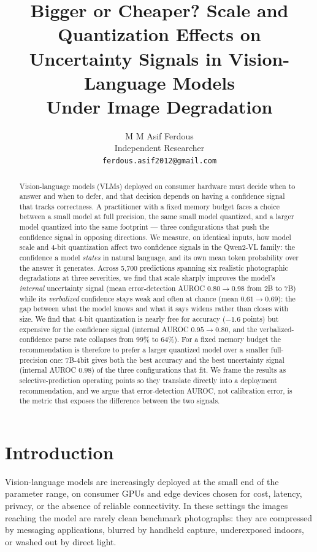 \documentclass[11pt]{article}
\title{Bigger or Cheaper? Scale and Quantization Effects on\\
       Uncertainty Signals in Vision-Language Models\\
       Under Image Degradation}
\author{M M Asif Ferdous \\
        Independent Researcher \\
        \texttt{ferdous.asif2012@gmail.com}}
\begin{document}
\maketitle

\begin{abstract}
Vision-language models (VLMs) deployed on consumer hardware must decide when to
answer and when to defer, and that decision depends on having a confidence
signal that tracks correctness. A practitioner with a fixed memory budget faces
a choice between a small model at full precision, the same small model
quantized, and a larger model quantized into the same footprint --- three
configurations that push the confidence signal in opposing directions.
We measure, on identical inputs, how model scale and 4-bit quantization affect
two confidence signals in the Qwen2-VL family: the confidence a model
\emph{states} in natural language, and its own mean token probability over the
answer it generates. Across 5{,}700 predictions spanning six realistic
photographic degradations at three severities, we find that scale sharply
improves the model's \emph{internal} uncertainty signal (mean error-detection
AUROC $0.80\!\to\!0.98$ from 2B to 7B) while its \emph{verbalized} confidence
stays weak and often at chance (mean $0.61\!\to\!0.69$): the gap between what the
model knows and what it says widens rather than closes with size. We find that
4-bit quantization is nearly free for accuracy ($-1.6$ points) but expensive for
the confidence signal (internal AUROC $0.95\!\to\!0.80$, and the
verbalized-confidence parse rate collapses from $99\%$ to $64\%$). For a fixed
memory budget the recommendation is therefore to prefer a larger quantized model
over a smaller full-precision one: 7B-4bit gives both the best accuracy and the
best uncertainty signal (internal AUROC $0.98$) of the three configurations that
fit. We frame the results as selective-prediction operating points so they
translate directly into a deployment recommendation, and we argue that
error-detection AUROC, not calibration error, is the metric that exposes the
difference between the two signals.
\end{abstract}

\section{Introduction}
Vision-language models are increasingly deployed at the small end of the
parameter range, on consumer GPUs and edge devices chosen for cost, latency,
privacy, or the absence of reliable connectivity. In these settings the images
reaching the model are rarely clean benchmark photographs: they are compressed
by messaging applications, blurred by handheld capture, underexposed indoors, or
washed out by direct light.
\end{document}
